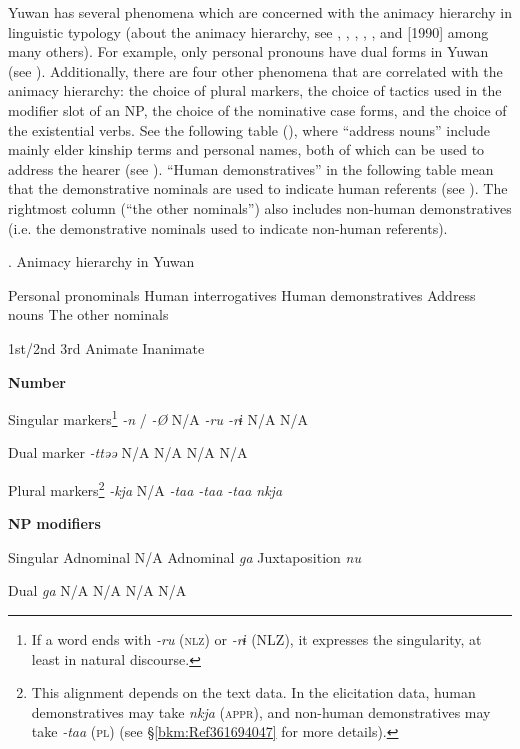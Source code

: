 \begin{table}
Yuwan has several phenomena which are concerned with the animacy hierarchy in linguistic typology (about the animacy hierarchy, see \citealt{Silverstein1976}, \citealt{Comrie1989}, \citealt{Dixon1994}, \citealt{Whaley1997}, \citealt{Corbett2000}, and \citealt{Croft2003} [1990] among many others). For example, only personal pronouns have dual forms in Yuwan (see ). Additionally, there are four other phenomena that are correlated with the animacy hierarchy: the choice of plural markers, the choice of tactics used in the modifier slot of an NP, the choice of the nominative case forms, and the choice of the existential verbs. See the following table (), where “address nouns” include mainly elder kinship terms and personal names, both of which can be used to address the hearer (see ). “Human demonstratives” in the following table mean that the demonstrative nominals are used to indicate human referents (see ). The rightmost column (“the other nominals”) also includes non-human demonstratives (i.e. the demonstrative nominals used to indicate non-human referents).

\begin{table}
\caption{\label{tab:key:44}}\textmd{. Animacy hierarchy in Yuwan}


  Personal pronominals  Human interrogatives  Human demonstratives  Address nouns  The other nominals

  1st/2nd  3rd        Animate  Inanimate

\textbf{Number}          

Singular markers\footnote{If a word ends with \textit{-ru} (\textsc{nlz}) or \textit{-rɨ} (NLZ), it expresses the singularity, at least in natural discourse.}  \textit{-n} / \textit{-Ø}  N/A  \textit{-ru  -rɨ} N/A  N/A

Dual marker     \textit{-ttəə} N/A  N/A  N/A  N/A

Plural markers\footnote{This alignment depends on the text data. In the elicitation data, human demonstratives may take \textit{nkja} (\textsc{appr}), and non-human demonstratives may take \textit{-taa} (\textsc{pl}) (see §\ref{bkm:Ref361694047} for more details).}  \textit{-kja} N/A  \textit{-taa  -taa  -taa  nkja}

\textbf{NP} \textbf{modifiers}          

Singular  Adnominal  N/A  Adnominal  \textit{ga}  Juxtaposition  \textit{nu}

Dual     \textit{ga}  N/A  N/A  N/A  N/A


\end{table}
\end{table}

